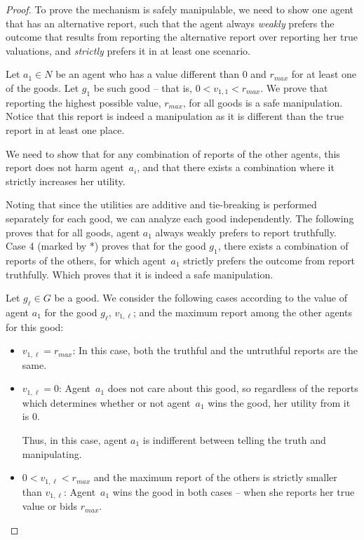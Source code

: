 \begin{proof}
    To prove the mechanism is safely manipulable, we need to show one agent that has an alternative report, such that the agent always \emph{weakly} prefers the outcome that results from reporting the alternative report over reporting her true valuations, and \emph{strictly} prefers it in at least one scenario.
    
     Let $a_1 \in N$ be an agent who has a value different than $0$ and $r_{max}$ for at least one of the goods. Let $g_1$ be such good -- that is, $0 < v_{1,1} < r_{max}$.
     We prove that reporting the highest possible value, $r_{max}$, for all goods is a safe manipulation.
     Notice that this report is indeed a manipulation as it is different than the true report in at least one place.
    
    We need to show that for any combination of reports of the other agents, this report does not harm agent~$a_i$, and that there exists a combination where it strictly increases her utility. 

    Noting that since the utilities are additive and tie-breaking is performed separately for each good, we can analyze each good independently. 
    The following proves that for all goods, agent $a_1$ always weakly prefers to report truthfully. Case 4 (marked by *) proves that for the good $g_1$, there exists a combination of reports of the others, for which agent~$a_1$ strictly prefers the outcome from report truthfully.
    Which proves that it is indeed a safe manipulation. 

    
    Let $g_{\ell} \in G$ be a good. 
    We consider the following cases according to the value of agent $a_1$ for the good $g_{\ell}$, $v_{1, \ell}$; and the maximum report among the other agents for this good:
    \begin{itemize}
        \item $v_{1,\ell} = r_{max}$: In this case, both the truthful and the untruthful reports are the same.

        \item $v_{1,\ell} =0$: Agent~$a_1$ does not care about this good, so regardless of the reports which determines whether or not agent~$a_1$ wins the good, her utility from it is $0$.

        Thus, in this case, agent $a_1$ is indifferent between telling the truth and manipulating.
        
    
        \item $0 < v_{1,\ell} < r_{max}$ and the maximum report of the others is strictly smaller than $v_{1,\ell}$: Agent~$a_1$ wins the good in both cases -- when she reports her true value or bids $r_{max}$.
        

\end{itemize}
\end{proof}
